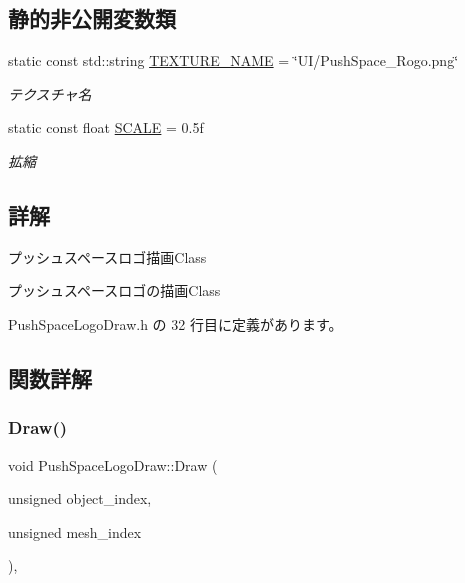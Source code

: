 \subsection*{静的非公開変数類}
\begin{DoxyCompactItemize}
\item 
static const std\+::string \mbox{\hyperlink{class_push_space_logo_draw_a74a33f8c1a9d16c3048d520a35e3b132}{T\+E\+X\+T\+U\+R\+E\+\_\+\+N\+A\+ME}} = \char`\"{}UI/Push\+Space\+\_\+\+Rogo.\+png\char`\"{}
\begin{DoxyCompactList}\small\item\em テクスチャ名 \end{DoxyCompactList}\item 
static const float \mbox{\hyperlink{class_push_space_logo_draw_a9ba8f8cd38e75d4900691645a1b0b8f3}{S\+C\+A\+LE}} = 0.\+5f
\begin{DoxyCompactList}\small\item\em 拡縮 \end{DoxyCompactList}\end{DoxyCompactItemize}


\subsection{詳解}
プッシュスペースロゴ描画\+Class 

プッシュスペースロゴの描画\+Class 

 Push\+Space\+Logo\+Draw.\+h の 32 行目に定義があります。



\subsection{関数詳解}
\mbox{\label{class_push_space_logo_draw_a647dddefc43d66cb3c720ee8fbb6a783}} 
\subsubsection{\texorpdfstring{Draw()}{Draw()}}
{\footnotesize\ttfamily void Push\+Space\+Logo\+Draw\+::\+Draw (\begin{DoxyParamCaption}\item[{unsigned}]{object\+\_\+index,  }\item[{unsigned}]{mesh\+\_\+index }\end{DoxyParamCaption})\hspace{0.3cm}{\ttfamily [override]}, {\ttfamily [virtual]}}



